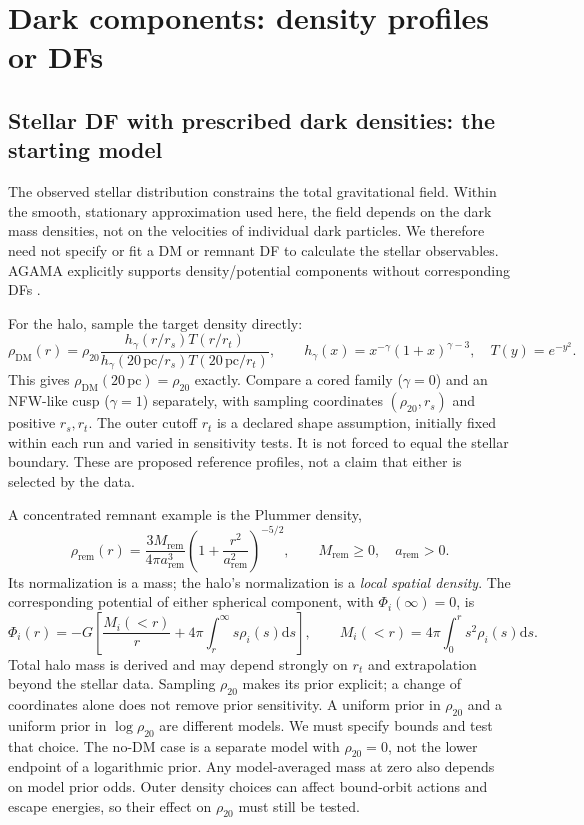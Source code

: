 \documentclass[11pt,a4paper]{article}
\newcommand{\dd}{\mathrm{d}}
\newcommand{\pc}{\,\mathrm{pc}}
\newcommand{\dm}{\mathrm{DM}}
\newcommand{\remn}{\mathrm{rem}}
\begin{document}
\section{Dark components: density profiles or DFs}
\label{sec:dark}

\subsection{Stellar DF with prescribed dark densities: the starting model}
\label{sec:prescribed}

The observed stellar distribution constrains the total gravitational field.
Within the smooth, stationary approximation used here, the field depends on
the dark mass densities, not on the velocities of individual dark particles.
We therefore need not specify or fit a DM or remnant DF to calculate the
stellar observables. AGAMA explicitly supports density/potential components
without corresponding DFs \citep[section~5.2]{2019MNRAS.482.1525V}.

For the halo, sample the target density directly:
\begin{equation}
 \rho_\dm(r)=\rho_{20}
 \frac{h_\gamma(r/r_s)T(r/r_t)}
      {h_\gamma(20\pc/r_s)T(20\pc/r_t)},\qquad
 h_\gamma(x)=x^{-\gamma}(1+x)^{\gamma-3},\quad T(y)=e^{-y^2}.
 \label{eq:dark-density}
\end{equation}
This gives $\rho_\dm(20\pc)=\rho_{20}$ exactly. Compare a cored family
($\gamma=0$) and an NFW-like cusp ($\gamma=1$) separately, with sampling
coordinates $(\rho_{20},r_s)$ and positive $r_s,r_t$. The outer cutoff $r_t$
is a declared shape assumption, initially fixed within each run and varied
in sensitivity tests. It is not forced to equal the stellar boundary.
These are proposed reference profiles, not a claim that either is selected
by the data.

A concentrated remnant example is the Plummer density,
\begin{equation}
 \rho_\remn(r)=\frac{3M_\remn}{4\pi a_\remn^3}
       \left(1+\frac{r^2}{a_\remn^2}\right)^{-5/2},
 \qquad M_\remn\geq0,\quad a_\remn>0.
 \label{eq:remnant-density}
\end{equation}
Its normalization is a mass; the halo's normalization is a \emph{local
spatial density}. The corresponding potential of either spherical component,
with $\Phi_i(\infty)=0$, is
\begin{equation}
 \Phi_i(r)=-G\left[\frac{M_i(<r)}{r}
                   +4\pi\int_r^\infty s\rho_i(s)\dd s\right],
 \qquad M_i(<r)=4\pi\int_0^r s^2\rho_i(s)\dd s.
 \label{eq:dark-potential}
\end{equation}
Total halo mass is derived and may depend strongly on $r_t$ and extrapolation
beyond the stellar data. Sampling $\rho_{20}$ makes its prior explicit; a
change of coordinates alone does not remove prior sensitivity. A uniform
prior in $\rho_{20}$ and a uniform prior in $\log\rho_{20}$ are different
models. We must specify bounds and test that choice. The no-DM case is a
separate model with $\rho_{20}=0$, not the lower endpoint of a logarithmic
prior. Any model-averaged mass at zero also depends on model prior odds.
Outer density choices can affect bound-orbit actions and escape energies,
so their effect on $\rho_{20}$ must still be tested.
\end{document}
